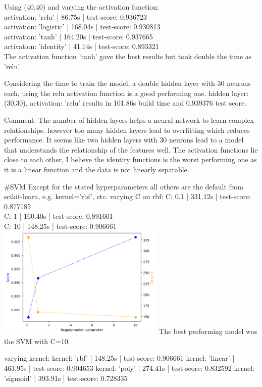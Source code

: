 \documentclass[12pt, letterpaper]{article}
\begin{document}
Using (40,40) and varying the activation function: \\
activation:  'relu' | 86.75s | test-score: 0.936723 \\ 
activation: 'logistic' | 168.04s | test-score: 0.930813 \\ 
activation: 'tanh' | 164.20s | test-score: 0.937665 \\ 
activation: 'identity' | 41.14s | test-score: 0.893321 \\ 
The activation function 'tanh' gave the best results but took double the time as 'relu'.

Considering the time to train the model, a double hidden layer with 30 neurons each, using the relu activation function is a good performing one.
hidden layer: (30,30), activation: 'relu' results in 101.86s build time and 0.939376 test score.

Comment:
The number of hidden layers helps a neural network to learn complex relationships, however too many hidden layers lead to overfitting which reduces performance.
It seems like two hidden layers with 30 neurons lead to a model that understands the relationship of the features well.
The activation functions lie close to each other, I believe the identity functions is the worst performing one as it is a linear function and the data is not linearly separable.

#SVM
Except for the stated hyperparameters all others are the default from scikit-learn, e.g. kernel='rbf', etc.
varying C on rbf:
C: 0.1 | 331.12s | test-score: 0.877185 \\
C: 1 | 160.40s | test-score: 0.891601 \\
C: 10 | 148.25s | test-score: 0.906661 \\
\includegraphics[width=0.6\textwidth]{svm_c_compiled.png}
The best performing model was the SVM with C=10.

varying kernel:
kernel: 'rbf' | 148.25s | test-score: 0.906661
kernel: 'linear' | 463.95s | test-score: 0.904653
kernel: 'poly' | 274.41s | test-score: 0.832592
kernel: 'sigmoid' | 393.91s | test-score: 0.728335
\end{document}
